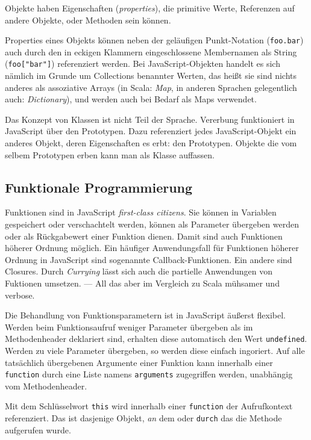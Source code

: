 \documentclass[a4paper, 12pt, hidelinks, listof=totoc, listoftables=totoc, bibliography=totoc]{scrreprt}
\begin{document}
Objekte haben Eigenschaften (\textit{properties}), die primitive Werte, Referenzen auf andere Objekte, oder Methoden sein können.

Properties eines Objekts können neben der geläufigen Punkt-Notation (\texttt{foo.bar}) auch durch den in eckigen Klammern eingeschlossene Membernamen als String (\texttt{foo["bar"]}) referenziert werden. Bei JavaScript-Objekten handelt es sich nämlich im Grunde um Collections benannter Werten, das heißt sie sind nichts anderes als assoziative Arrays (in Scala: \textit{Map}, in anderen Sprachen gelegentlich auch: \textit{Dictionary}), und werden auch bei Bedarf als Maps verwendet.

Das Konzept von Klassen ist nicht Teil der Sprache. Vererbung funktioniert in JavaScript über den Prototypen. Dazu referenziert jedes JavaScript-Objekt ein anderes Objekt, deren Eigenschaften es erbt: den Prototypen. Objekte die vom selbem Prototypen erben kann man als Klasse auffassen.\cite{mdn.WWO}\cite[S. 115 ff., S. 199 ff.]{flanagan2011.JDG}

\subsection{Funktionale Programmierung}

Funktionen sind in JavaScript \textit{first-class citizens}. Sie können in Variablen gespeichert oder verschachtelt werden, können als Parameter übergeben werden oder als Rückgabewert einer Funktion dienen. Damit sind auch Funktionen höherer Ordnung möglich. Ein häufiger Anwendungsfall für Funktionen höherer Ordnung in JavaScript sind sogenannte Callback-Funktionen. Ein andere sind Closures. Durch \textit{Currying} lässt sich auch die partielle Anwendungen von Fuktionen umsetzen. --- All das aber im Vergleich zu Scala mühsamer und verbose.

Die Behandlung von Funktionsparametern ist in JavaScript äußerst flexibel. Werden beim Funktionsaufruf weniger Parameter übergeben als im Methodenheader deklariert sind, erhalten diese automatisch den Wert \texttt{undefined}. Werden zu viele Parameter übergeben, so werden diese einfach ingoriert. Auf alle tatsächlich übergebenen Argumente einer Funktion kann innerhalb einer \texttt{function} durch eine Liste namens \texttt{arguments} zugegriffen werden, unabhängig vom Methodenheader.

Mit dem Schlüsselwort \texttt{this} wird innerhalb einer \texttt{function} der Aufrufkontext referenziert. Das ist dasjenige Objekt, \textit{an} dem oder \texttt{durch} das die Methode aufgerufen wurde. 
\cite[199 ff.]{flanagan2011.JDG}
\end{document}
